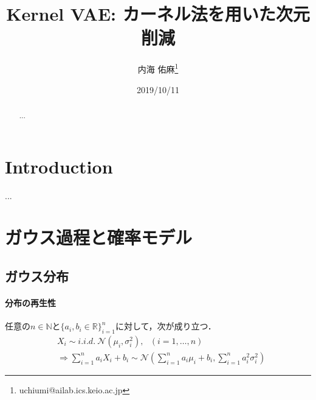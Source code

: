 \documentclass[11pt,a4j]{jarticle}
\title{Kernel VAE: カーネル法を用いた次元削減}
\date{2019/10/11}
\author[1]{内海 佑麻\thanks{uchiumi@ailab.ics.keio.ac.jp}}
\affil[1]{慶應義塾大学理工学部情報工学科}
\begin{document}
  \maketitle
  
  \begin{abstract}
    ...
  \end{abstract}

  \tableofcontents

  \section{Introduction}
    ...
  \section{ガウス過程と確率モデル}

    \subsection{ガウス分布}
    \paragraph{分布の再生性}
      任意の$n \in \mathbb{N}$と${\{ a_i, b_i \in \mathbb{R} \}}_{i=1}^{n}$に対して，次が成り立つ．
      \begin{align}
        &X_i \sim i.i.d. ~ \mathcal{N}(\mu_i, \sigma_i^2), ~~~ (i=1,\dots,n) \\
        &\Rightarrow \sum_{i=1}^{n} a_i X_i + b_i \sim \mathcal{N} \left( \sum_{i=1}^{n} a_i \mu_i + b_i, \sum_{i=1}^{n} a_i^2 \sigma_i^2 \right)
      \end{align}
\end{document}
